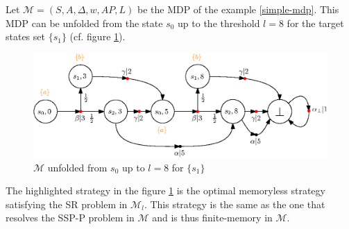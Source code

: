 \begin{example}
  Let $\mathcal{M} = (S, A, \Delta, w, AP, L)$ be the MDP of the example \ref{simple-mdp}.
  This MDP can be unfolded from the state $s_0$ up to the threshold $l = 8$ for the target states set $\{s_1\}$ (cf. figure \ref{unfolding}).
  \begin{figure}[h!]
    \centering
    \includegraphics[width=0.8\linewidth]{resources/unfolding}
    \caption{$\mathcal{M}$ unfolded from $s_0$ up to $l=8$ for $\{s_1\}$}\label{unfolding}
  \end{figure}
  The highlighted strategy in the figure \ref{unfolding} is the optimal memoryless strategy satisfying the SR problem in $\mathcal{M}_l$. This strategy is the
  same as the one that resolves the SSP-P problem in $\mathcal{M}$ and is thus finite-memory in $\mathcal{M}$.
\end{example}
